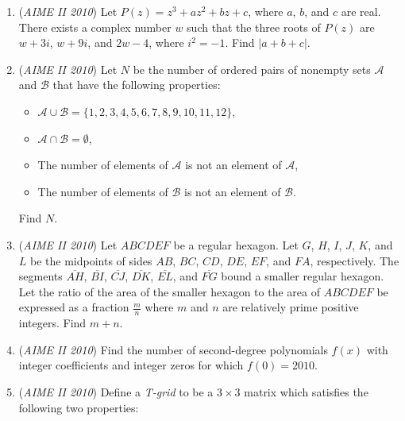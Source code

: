 \begin{enumerate}
 

	\item (\textit{AIME II 2010}) Let $P(z)=z^3+az^2+bz+c$, where $a$, $b$, and $c$ are real. There exists a complex number $w$ such that the three roots of $P(z)$ are $w+3i$, $w+9i$, and $2w-4$, where $i^2=-1$. Find $|a+b+c|$.


 

	\item (\textit{AIME II 2010}) Let $N$ be the number of ordered pairs of nonempty sets $\mathcal{A}$ and $\mathcal{B}$ that have the following properties:


 
            \begin{itemize}

        \item  $\mathcal{A} \cup \mathcal{B} = \{1,2,3,4,5,6,7,8,9,10,11,12\}$,

        \item  $\mathcal{A} \cap \mathcal{B} = \emptyset$, 

        \item  The number of elements of $\mathcal{A}$ is not an element of $\mathcal{A}$,

        \item  The number of elements of $\mathcal{B}$ is not an element of $\mathcal{B}$.

            \end{itemize}
            Find $N$.


 

	\item (\textit{AIME II 2010}) Let $ABCDEF$ be a regular hexagon. Let $G$, $H$, $I$, $J$, $K$, and $L$ be the midpoints of sides $AB$, $BC$, $CD$, $DE$, $EF$, and $FA$, respectively. The segments $\overline{AH}$, $\overline{BI}$, $\overline{CJ}$, $\overline{DK}$, $\overline{EL}$, and $\overline{FG}$ bound a smaller regular hexagon. Let the ratio of the area of the smaller hexagon to the area of $ABCDEF$ be expressed as a fraction $\frac {m}{n}$ where $m$ and $n$ are relatively prime positive integers. Find $m + n$.


 

	\item (\textit{AIME II 2010}) Find the number of second-degree polynomials $f(x)$ with integer coefficients and integer zeros for which $f(0)=2010$.


 

	\item (\textit{AIME II 2010}) Define a \textit{T-grid} to be a $3\times3$ matrix which satisfies the following two properties:



\end{enumerate}
